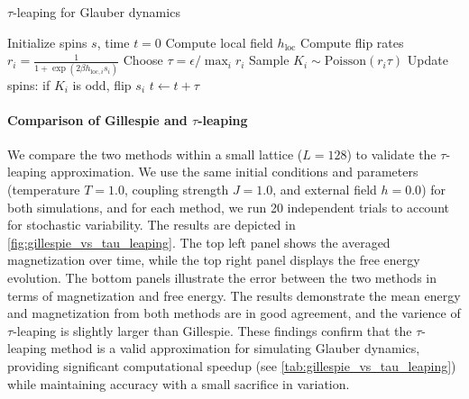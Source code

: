 \documentclass[11pt,a4paper]{article}
\begin{document}
\begin{algorithm}[h]
\caption{$\tau$-leaping for Glauber dynamics}
\label{alg:tau-leaping}
\begin{algorithmic}[1]
\State Initialize spins $s$, time $t=0$
    \State Compute local field $h_{\text{loc}}$
    \State Compute flip rates $r_i = \frac{1}{1 + \exp(2 \beta h_{\text{loc},i} s_i)}$
    \State Choose $\tau = \epsilon / \max_i r_i$
    \State Sample $K_i \sim \mathrm{Poisson}(r_i \tau)$
    \State Update spins: if $K_i$ is odd, flip $s_i$
    \State $t \gets t + \tau$
\EndWhile
\end{algorithmic}
\end{algorithm}

\paragraph{Comparison of Gillespie and $\tau$-leaping} We compare the two methods within a small lattice ($L=128$) to validate the $\tau$-leaping approximation. 
We use the same initial conditions and parameters (temperature $T = 1.0$, coupling strength $J = 1.0$, and external field $h = 0.0$) for both simulations, and for each method, we run 20 independent trials to account for stochastic variability. 
The results are depicted in \cref{fig:gillespie_vs_tau_leaping}. 
The top left panel shows the averaged magnetization over time, while the top right panel displays the free energy evolution. The bottom panels illustrate the error between the two methods in terms of magnetization and free energy. 
The results demonstrate the mean energy and magnetization from both methods are in good agreement, and the varience of $\tau$-leaping is slightly larger than Gillespie. 
These findings confirm that the $\tau$-leaping method is a valid approximation for simulating Glauber dynamics, providing significant computational speedup (see \cref{tab:gillespie_vs_tau_leaping}) while maintaining accuracy with a small sacrifice in variation.
\end{document}
